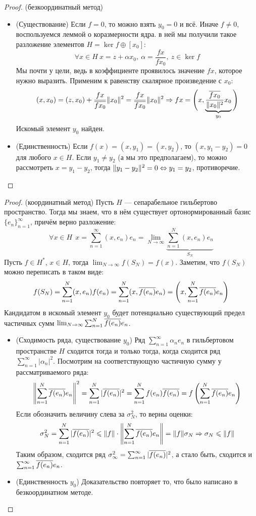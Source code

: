 \begin{proof} (безкоординатный метод)
	\begin{itemize}
		\item (Существование) Если $f = 0$, то можно взять $y_0 = 0$ и всё. Иначе $f \neq 0$, воспользуемся леммой о коразмерности ядра. в ней мы получили такое разложение элементов $H = \ker f \oplus [x_0]$:
		\[
			\forall x \in H\ x = z + \alpha x_0,\ \alpha = \frac{fx}{fx_0},\ z \in \ker f
		\]
		Мы почти у цели, ведь в коэффициенте проявилось значение $fx$, которое нужно выразить. Применим к равенству скалярное произведение с $x_0$:
		\[
			(x, x_0) = (z, x_0) + \frac{fx}{\overline{fx_0}} \|x_0\|^2 = \frac{fx}{\overline{fx_0}} \|x_0\|^2 \Rightarrow fx = \Bigg(x, \underbrace{\frac{\overline{fx_0}}{\|x_0\|^2} x_0}_{y_0}\Bigg)
		\]
		Искомый элемент $y_0$ найден.
		
		\item (Единственность) Если $f(x) = (x, y_1) = (x, y_2)$, то $(x, y_1 - y_2) = 0$ для любого $x \in H$. Если $y_1 \neq y_2$ (а мы это предполагаем), то можно рассмотреть $x = y_1 - y_2$, тогда $\|y_1 - y_2\|^2 = 0 \Leftrightarrow y_1 = y_2$, противоречие.
	\end{itemize}
\end{proof}

\begin{proof} (координатный метод)
	Пусть $H$ --- сепарабельное гильбертово пространство. Тогда мы знаем, что в нём существует ортонормированный базис $\{e_n\}_{n = 1}^\infty$, причём верно разложение:
	\[
		\forall x \in H\ \ x = \sum_{n = 1}^\infty (x, e_n)e_n = \lim_{N \to \infty} \underbrace{\sum_{n = 1}^N (x, e_n)e_n}_{S_N}
	\]
	Пусть $f \in H^*$, $x \in H$, тогда $\lim_{N \to \infty} f(S_N) = f(x)$. Заметим, что $f(S_N)$ можно переписать в таком виде:
	\[
		f(S_N) = \sum_{n = 1}^N (x, e_n)f(e_n) = \sum_{n = 1}^N (x, \overline{f(e_n)}e_n) = \left(x, \sum_{n = 1}^N \overline{f(e_n)}e_n\right)
	\]
	Кандидатом в искомый элемент $y_0$ будет потенциально существующий предел частичных сумм $\lim_{N \to \infty} \sum_{n = 1}^N \overline{f(e_n)}e_n$.
	\begin{itemize}
		\item (Сходимость ряда, существование $y_0$) Ряд $\sum_{n = 1}^\infty \alpha_n e_n$ в гильбертовом пространстве $H$ сходится тогда и только тогда, когда сходится ряд $\sum_{n = 1}^\infty |\alpha_n|^2$. Посмотрим на соответствующую частичную сумму у рассматриваемого ряда:
		\[
			\left\|\sum_{n = 1}^N \overline{f(e_n)}e_n\right\|^2 = \sum_{n = 1}^N |\overline{f(e_n)}|^2 = \sum_{n = 1}^N f(e_n)\overline{f(e_n)} = f\left(\sum_{n = 1}^N \overline{f(e_n)}e_n\right)
		\]
		Если обозначить величину слева за $\sigma_N^2$, то верны оценки:
		\[
			\sigma_N^2 = \sum_{n = 1}^N |\overline{f(e_n)}|^2 \leqslant \|f\| \cdot \left\|\sum_{n = 1}^N \overline{f(e_n)}e_n\right\| = \|f\|\sigma_N \Rightarrow \sigma_N \leqslant \|f\|
		\]
		Таким образом, сходится ряд $\sigma_\infty^2 = \sum_{n = 1}^\infty |\overline{f(e_n)}|^2$, а стало быть, сходится и $\sum_{n = 1}^\infty \overline{f(e_n)}e_n$.
		
		\item (Единственность $y_0$) Доказательство повторяет то, что было написано в безкоординатном методе.
	\end{itemize}
\end{proof}

